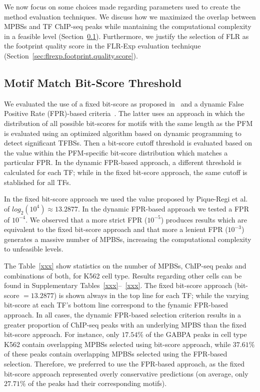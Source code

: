 We now focus on some choices made regarding parameters used to create the method evaluation techniques. We discuss how we maximized the overlap between MPBSs and TF ChIP-seq peaks while mantaining the computational complexity in a feasible level (Section~\ref{sec:motif.match.bitscore.threshold}). Furthermore, we justify the selection of FLR as the footprint quality score in the FLR-Exp evaluation technique (Section~\ref{sec:flrexp.footprint.quality.score}).

\subsection{Motif Match Bit-Score Threshold}
\label{sec:motif.match.bitscore.threshold}

We evaluated the use of a fixed bit-score as proposed in~\cite{pique2011} and a dynamic False Positive Rate (FPR)-based criteria~\cite{wilczynski2009}. The latter uses an approach in which the distribution of all possible bit-scores for motifs with the same length as the PFM is evaluated using an optimized algorithm based on dynamic programming to detect significant TFBSs. Then a bit-score cutoff threshold is evaluated based on the value within the PFM-specific bit-score distribution which matches a particular FPR. In the dynamic FPR-based approach, a different threshold is calculated for each TF; while in the fixed bit-score approach, the same cutoff is stablished for all TFs.

In the fixed bit-score approach we used the value proposed by Pique-Regi et al.~\cite{pique2011} of $ log_2(10^4) \approx 13.2877 $. In the dynamic FPR-based approach we tested a FPR of $10^{-4}$. We observed that a more strict FPR ($10^{-5}$) produces results which are equivalent to the fixed bit-score approach and that more a lenient FPR ($10^{-3}$) generates a massive number of MPBSs, increasing the computational complexity to unfeasible levels.

The Table~\ref{xxx} show statistics on the number of MPBSs, ChIP-seq peaks and combinations of both, for K562 cell type. Results regarding other cells can be found in Supplementary Tables~\ref{xxx}--~\ref{xxx}. The fixed bit-score approach (bit-score $= 13.2877 $) is shown always in the top line for each TF; while the varying bit-score at each TF's bottom line correspond to the fynamic FPR-based approach. In all cases, the dynamic FPR-based selection criterion results in a greater proportion of ChIP-seq peaks with an underlying MPBS than the fixed bit-score approach. For instance, only $17.54\%$ of the GABPA peaks in cell type K562 contain overlapping MPBSs selected using bit-score approach, while $37.61\%$ of these peaks contain overlapping MPBSs selected using the FPR-based selection. Therefore, we preferred to use the FPR-based approach, as the fixed bit-score approach represented overly conservative predictions (on average, only $27.71\%$ of the peaks had their corresponding motifs).

